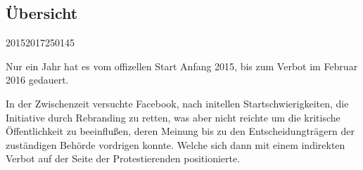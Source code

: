 \documentclass{article}
\begin{document}
\subsection{Übersicht}

\begin{timeline}{2015}{2017}{250}{145}
\end{timeline}

Nur ein Jahr hat es vom offizellen Start Anfang 2015, bis zum Verbot im Februar 2016 gedauert.

In der Zwischenzeit versuchte Facebook, nach initellen Startschwierigkeiten, die Initiative durch Rebranding zu retten, was aber nicht reichte um die kritische Öffentlichkeit zu beeinflußen, deren Meinung bis zu den Entscheidungträgern der zuständigen Behörde vordrigen konnte.
Welche sich dann mit einem indirekten Verbot auf der Seite der Protestierenden positionierte.

\end{document}
